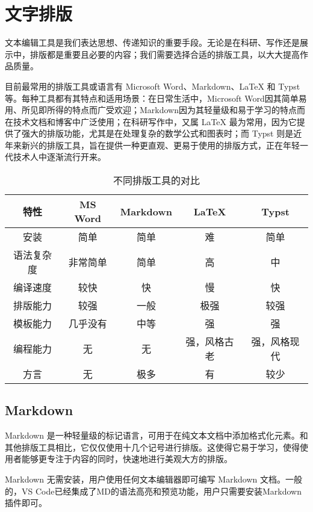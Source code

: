 \documentclass[../main.tex]{subfiles}
\begin{document}
\chapter{文字排版}

文本编辑工具是我们表达思想、传递知识的重要手段。无论是在科研、写作还是展示中，排版都是重要且必要的内容；我们需要选择合适的排版工具，以大大提高作品质量。

目前最常用的排版工具或语言有 Microsoft Word、Markdown、LaTeX 和 Typst 等。每种工具都有其特点和适用场景：在日常生活中，Microsoft Word因其简单易用、所见即所得的特点而广受欢迎；Markdown因为其轻量级和易于学习的特点而在技术文档和博客中广泛使用；在科研写作中，又属 LaTeX 最为常用，因为它提供了强大的排版功能，尤其是在处理复杂的数学公式和图表时；而 Typst 则是近年来新兴的排版工具，旨在提供一种更直观、更易于使用的排版方式，正在年轻一代技术人中逐渐流行开来。

\begin{table}[htbp]
\centering
\begin{tabular}{||c||c|c|c|c||}
\hline\hline
\textbf{特性} & \textbf{MS Word} & \textbf{Markdown} & \textbf{LaTeX} & \textbf{Typst} \\
\hline\hline
安装 & 简单 & 简单 & 难 & 简单 \\
\hline
语法复杂度 & 非常简单 & 简单 & 高 & 中 \\
\hline
编译速度 & 较快 & 快 & 慢 & 快 \\
\hline
排版能力 & 较强 & 一般 & 极强 & 较强 \\
\hline
模板能力 & 几乎没有 & 中等 & 强 & 强 \\
\hline
编程能力 & 无 & 无 & 强，风格古老 & 强，风格现代 \\
\hline
方言 & 无 & 极多 & 有 & 较少 \\
\hline\hline
\end{tabular}
\caption{不同排版工具的对比}
\end{table}

\section{Markdown}

Markdown 是一种轻量级的标记语言，可用于在纯文本文档中添加格式化元素。和其他排版工具相比，它仅仅使用十几个记号进行排版。这使得它易于学习，使得使用者能够更专注于内容的同时，快速地进行美观大方的排版。

Markdown 无需安装，用户使用任何文本编辑器即可编写 Markdown 文档。一般的，VS Code已经集成了MD的语法高亮和预览功能，用户只需要安装Markdown插件即可。
\end{document}
